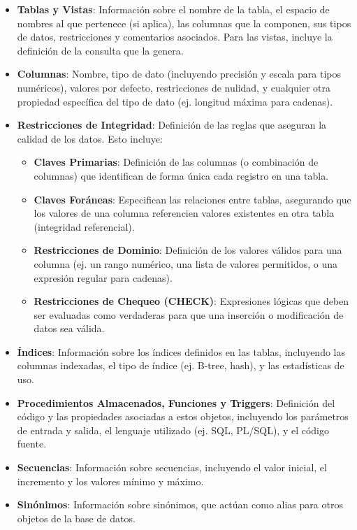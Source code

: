 \begin{itemize}
    \item \textbf{Tablas y Vistas}: Información sobre el nombre de la tabla, el espacio de nombres al que pertenece (si aplica), las columnas que la componen, sus tipos de datos, restricciones y comentarios asociados. Para las vistas, incluye la definición de la consulta que la genera.
    \item \textbf{Columnas}: Nombre, tipo de dato (incluyendo precisión y escala para tipos numéricos), valores por defecto, restricciones de nulidad, y cualquier otra propiedad específica del tipo de dato (ej. longitud máxima para cadenas).
    \item \textbf{Restricciones de Integridad}: Definición de las reglas que aseguran la calidad de los datos. Esto incluye:
    \begin{itemize}
        \item \textbf{Claves Primarias}: Definición de las columnas (o combinación de columnas) que identifican de forma única cada registro en una tabla.
        \item \textbf{Claves Foráneas}: Especifican las relaciones entre tablas, asegurando que los valores de una columna referencien valores existentes en otra tabla (integridad referencial).
        \item \textbf{Restricciones de Dominio}: Definición de los valores válidos para una columna (ej. un rango numérico, una lista de valores permitidos, o una expresión regular para cadenas).
        \item \textbf{Restricciones de Chequeo (CHECK)}: Expresiones lógicas que deben ser evaluadas como verdaderas para que una inserción o modificación de datos sea válida.
    \end{itemize}
    \item \textbf{Índices}: Información sobre los índices definidos en las tablas, incluyendo las columnas indexadas, el tipo de índice (ej. B-tree, hash), y las estadísticas de uso.
    \item \textbf{Procedimientos Almacenados, Funciones y Triggers}: Definición del código y las propiedades asociadas a estos objetos, incluyendo los parámetros de entrada y salida, el lenguaje utilizado (ej. SQL, PL/SQL), y el código fuente.
    \item \textbf{Secuencias}: Información sobre secuencias, incluyendo el valor inicial, el incremento y los valores mínimo y máximo.
    \item \textbf{Sinónimos}: Información sobre sinónimos, que actúan como alias para otros objetos de la base de datos.
\end{itemize}


